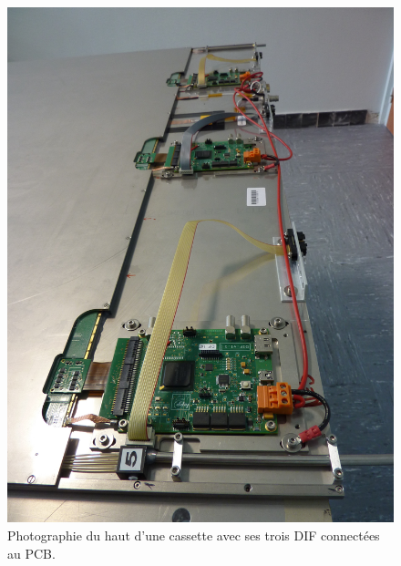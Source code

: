 \begin{figure}[!ht]
  \begin{center}
    \includegraphics[width=.4\textwidth,angle=90]{SDHCAL/figs/DIFCassette.jpg}
    \caption{Photographie du haut d'une cassette avec ses trois DIF connectées au PCB.}
    \label{fig:DIF}
  \end{center}
\end{figure}

